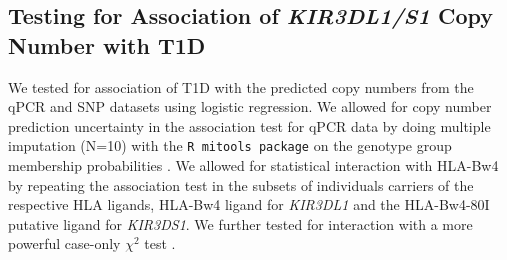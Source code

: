 

\subsection{Testing for Association of \emph{KIR3DL1/S1} Copy Number with T1D}

We tested for association of T1D with the predicted copy numbers from the qPCR and SNP datasets using logistic regression.
We allowed for copy number prediction uncertainty in the association test for qPCR data by doing multiple imputation (N=10)
with the \texttt{R mitools package} \citep{mitools} on the genotype group membership probabilities \citep{Cordell:2006da}. 
We allowed for statistical interaction with HLA-Bw4 by repeating the association test
in the subsets of individuals carriers of the respective HLA ligands,
HLA-Bw4 ligand for \emph{KIR3DL1} and the HLA-Bw4-80I putative ligand for \emph{KIR3DS1}.
We further tested for interaction with a more powerful case-only $\chi^2$ test \citep{Yang:1999wk,Cordell:2009jb}.





